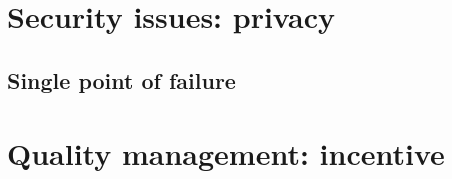 

\section{Security issues: privacy}

\subsection{Single point of failure}

\section{Quality management: incentive}

